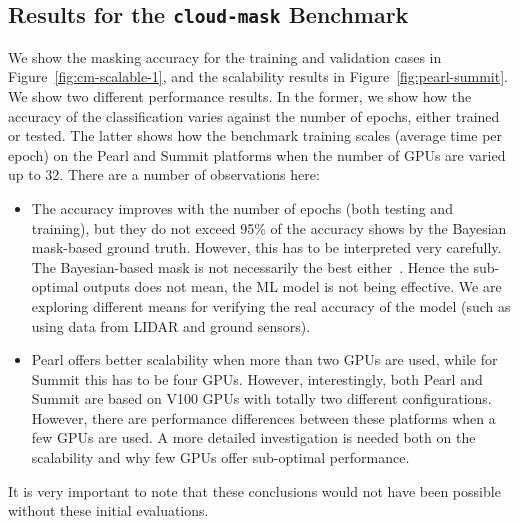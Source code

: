  
\subsection{Results for the {\tt cloud-mask} Benchmark}

We show the masking accuracy for the training and validation cases in Figure~\ref{fig:cm-scalable-1}, and the scalability results in Figure~\ref{fig:pearl-summit}.  We show two different performance results. In the former, we show how the accuracy of the classification varies against the number of epochs, either trained or tested. The latter shows how the benchmark training scales (average time per epoch) on the Pearl and Summit platforms when the number of GPUs are varied up to 32. There are a number of observations here:

\begin{itemize}
    \item The accuracy improves with the number of epochs (both testing and training), but they do not exceed 95\% of the accuracy shows by the Bayesian mask-based ground truth. However, this has to be interpreted very carefully. The Bayesian-based mask is not necessarily the best either~\cite{merchant:2005}. Hence the sub-optimal outputs does not mean, the ML model is not being effective. We are exploring different means for verifying the real accuracy of the model (such as using data from LIDAR and ground sensors). 
    \item Pearl offers better scalability when more than two GPUs are used, while for Summit this has to be four GPUs. However, interestingly, both Pearl and Summit are based on V100 GPUs with totally two different configurations. However, there are performance differences between these platforms when a few GPUs are used. A more detailed investigation is needed both on the scalability and why few GPUs offer sub-optimal performance.  
\end{itemize}

\noindent It is very important to note that these conclusions would not have been possible without these initial evaluations. 


